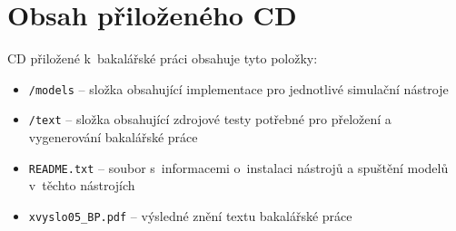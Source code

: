 \chapter{Obsah přiloženého CD}
CD přiložené k~bakalářské práci obsahuje tyto položky:

\begin{itemize}
    \item \texttt{/models} -- složka obsahující implementace pro jednotlivé simulační nástroje
    \item \texttt{/text} -- složka obsahující zdrojové testy potřebné pro přeložení a vygenerování bakalářské práce
    \item \texttt{README.txt} -- soubor s~informacemi o~instalaci nástrojů a spuštění modelů v~těchto nástrojích
    \item \texttt{xvyslo05\_BP.pdf} -- výsledné znění textu bakalářské práce
\end{itemize}
